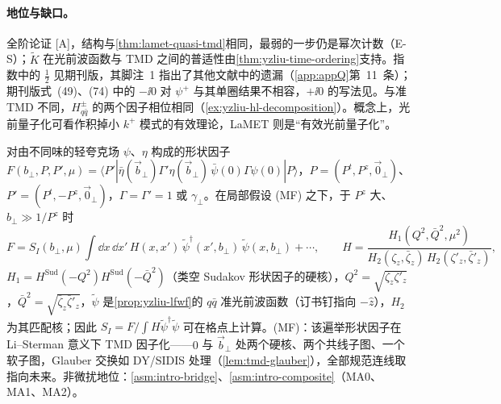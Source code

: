 \paragraph{地位与缺口。}全阶论证 [A]，结构与\cref{thm:lamet-quasi-tmd}相同，最弱的一步仍是幂次计数（E-S）；$\tilde K$ 在光前波函数与 TMD 之间的普适性由\cref{thm:yzliu-time-ordering}支持。指数中的 $\frac12$ 见期刊版\cite[式~(49)、(51)、(74)]{Ji:2021znw}，其脚注~1 指出了其他文献中的遗漏（\cref{app:appQ}第~11~条）；期刊版式~(49)、(74) 中的 $-\ii0$ 对 $\psi^+$ 与其单圈结果不相容，$+\ii0$ 的写法见\cite[式~(4.4)]{Liu:2023onm}。与准 TMD 不同，$H^\pm_{q\bar q}$ 的两个因子相位相同（\cref{ex:yzliu-hl-decomposition}）。概念上，光前量子化可看作积掉小 $k^+$ 模式的有效理论，LaMET 则是“有效光前量子化”\cite[第~II.C~节]{Ji:2021znw}。

\begin{proposition}\label{prop:yzliu-meson-ff}
对由不同味的轻夸克场 $\psi$、$\eta$ 构成的形状因子 $F(b_\perp,P,P',\mu)=\langle P'|\bar\eta(\vec b_\perp)\Gamma'\eta(\vec b_\perp)\,\bar\psi(0)\Gamma\psi(0)|P\rangle$，$P=(P^t,P^z,\vec0_\perp)$、$P'=(P^t,-P^z,\vec0_\perp)$，$\Gamma=\Gamma'=1$ 或 $\gamma_\perp$。在局部假设 (MF) 之下，于 $P^z$ 大、$b_\perp\gg1/P^z$ 时 %
\begin{equation}\label{eq:yzliu-meson-ff}
F=S_I(b_\perp,\mu)\int\dd x\,\dd x'\,H(x,x')\,\tilde\psi^\dagger(x',b_\perp)\,\tilde\psi(x,b_\perp)+\cdots,\qquad H=\frac{H_1(Q^2,\bar Q^2,\mu^2)}{H_2(\zeta_z,\bar\zeta_z)\,H_2(\zeta'_z,\bar\zeta'_z)},
\end{equation}
$H_1=H^{\mathrm{Sud}}(-Q^2)H^{\mathrm{Sud}}(-\bar Q^2)$（类空 Sudakov 形状因子的硬核），$Q^2=\sqrt{\zeta_z\zeta'_z}$，$\bar Q^2=\sqrt{\bar\zeta_z\bar\zeta'_z}$，$\tilde\psi$ 是\cref{prop:yzliu-lfwf}的 $q\bar q$ 准光前波函数（订书钉指向 $-\hat z$），$H_2$ 为其匹配核；因此 $S_I=F/\int H\tilde\psi^\dagger\tilde\psi$ 可在格点上计算。(MF)：该遍举形状因子在 Li--Sterman 意义下 TMD 因子化——$0$ 与 $\vec b_\perp$ 处两个硬核、两个共线子图、一个软子图，Glauber 交换如 DY/SIDIS 处理（\cref{lem:tmd-glauber}），全部规范连线取指向未来。非微扰地位：\cref{asm:intro-bridge}、\cref{asm:intro-composite}（MA0、MA1、MA2）。
\end{proposition}

